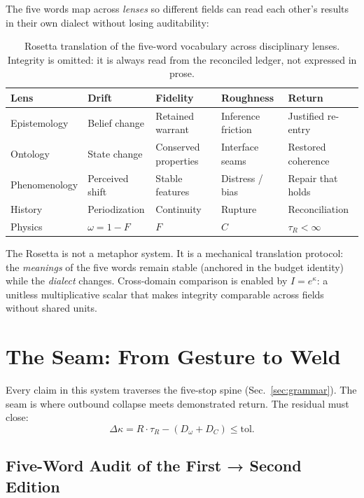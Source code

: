 \documentclass[
  aps,
  prd,
  preprint,
  superscriptaddress,
  nofootinbib,
  floatfix,
  longbibliography
]{revtex4-2}
\newcommand{\tR}{\tau_{\!R}}
\newcommand{\beq}{\begin{equation}}
\newcommand{\eeq}{\end{equation}}
\newcommand{\Fid}{F}
\newcommand{\Drft}{\omega}
\newcommand{\Curv}{C}
\newcommand{\Logint}{\kappa}
\begin{document}
The five words map across \emph{lenses} so different
fields can read each other's results in their own
dialect without losing auditability:

\begin{table}[t]
\centering
\small
\caption{Rosetta translation of the five-word vocabulary
  across disciplinary lenses.
  Integrity is omitted: it is always read from the
  reconciled ledger, not expressed in prose.}
\label{tab:rosetta}
\begin{tabular}{@{}lllll@{}}
\toprule
\textbf{Lens} & \textbf{Drift} & \textbf{Fidelity} &
  \textbf{Roughness} & \textbf{Return} \\
\midrule
Epistemology &
  Belief change & Retained warrant &
  Inference friction & Justified re-entry \\
Ontology &
  State change & Conserved properties &
  Interface seams & Restored coherence \\
Phenomenology &
  Perceived shift & Stable features &
  Distress / bias & Repair that holds \\
History &
  Periodization & Continuity &
  Rupture & Reconciliation \\
Physics &
  $\Drft = 1 - \Fid$ & $\Fid$ &
  $\Curv$ & $\tR < \infty$ \\
\bottomrule
\end{tabular}
\end{table}

The Rosetta is not a metaphor system.
It is a mechanical translation protocol:
the \emph{meanings} of the five words remain stable
(anchored in the budget identity) while the
\emph{dialect} changes.
Cross-domain comparison is enabled by $I = e^\Logint$:
a unitless multiplicative scalar that makes integrity
comparable across fields without shared units.

\section{The Seam: From Gesture to Weld}\label{sec:seam}

Every claim in this system traverses the five-stop spine
(Sec.~\ref{sec:grammar}).
The seam is where outbound collapse meets demonstrated return.
The residual must close:
\beq
  \Delta\Logint = R \cdot \tR - (D_\Drft + D_\Curv) \leq \mathrm{tol}.
\eeq

\subsection{Five-Word Audit of the First → Second Edition}
\end{document}
